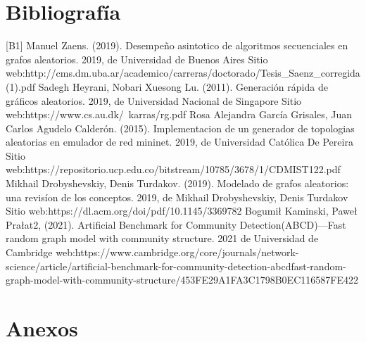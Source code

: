 \documentclass[11pt]{extarticle}
\begin{document}
\section{Bibliograf\'ia}
  [B1] Manuel Zaens. (2019). Desempeño asintotico de algoritmos secuenciales en grafos aleatorios. 2019, de Universidad de Buenos Aires Sitio web:\hfill\break http://cms.dm.uba.ar/academico/carreras/doctorado/Tesis\_Saenz\_corregida(1).pdf \hfill \break
  \break
  [B2] Sadegh Heyrani, Nobari Xuesong Lu. (2011). Generaci\'on r\'apida de gr\'aficos aleatorios. 2019, de Universidad Nacional de Singapore Sitio web:\hfill\break https://www.cs.au.dk/~karras/rg.pdf \hfill
  \break
  \break
  [B3] Rosa Alejandra Garc\'ia Grisales, Juan Carlos Agudelo Calder\'on. (2015). Implementacion de un generador de topologias aleatorias en emulador de red mininet. 2019, de Universidad Cat\'olica De Pereira Sitio web:\hfill\break https://repositorio.ucp.edu.co/bitstream/10785/3678/1/CDMIST122.pdf\hfill\break
  \break
  \break
  [B4] Mikhail Drobyshevskiy, Denis Turdakov. (2019). Modelado de grafos aleatorios: una revis\'ion de los conceptos. 2019, de Mikhail Drobyshevskiy, Denis Turdakov Sitio web:\hfill\break https://dl.acm.org/doi/pdf/10.1145/3369782\hfill\break
  \break
  \break
  [B5] Bogumił Kaminski, Paweł Prałat2, (2021). Artificial Benchmark for Community Detection(ABCD)—Fast random graph model with community structure. 2021 de Universidad de Cambridge web:\hfill\break https://www.cambridge.org/core/journals/network-science/article/artificial-benchmark-for-community-detection-abcdfast-random-graph-model-with-community-structure/453FE29A1FA3C1798B0EC116587FE422 \hfill \break
\section{Anexos}
\end{document}
